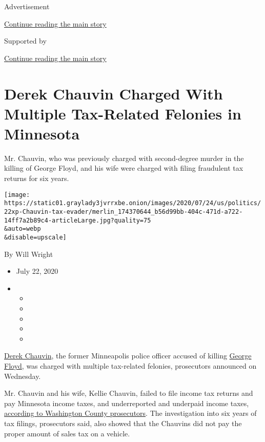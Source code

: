 Advertisement

\protect\hyperlink{after-top}{Continue reading the main story}

Supported by

\protect\hyperlink{after-sponsor}{Continue reading the main story}

\hypertarget{derek-chauvin-charged-with-multiple-tax-related-felonies-in-minnesota}{%
\section{Derek Chauvin Charged With Multiple Tax-Related Felonies in
Minnesota}\label{derek-chauvin-charged-with-multiple-tax-related-felonies-in-minnesota}}

Mr. Chauvin, who was previously charged with second-degree murder in the
killing of George Floyd, and his wife were charged with filing
fraudulent tax returns for six years.

\texttt{[image: https://static01.graylady3jvrrxbe.onion/images/2020/07/24/us/politics/22xp-Chauvin-tax-evader/merlin\_174370644\_b56d99bb-404c-471d-a722-14ff7a2b89c4-articleLarge.jpg?quality=75\\\&auto=webp\\\&disable=upscale]}

By Will Wright

\begin{itemize}
\item
  July 22, 2020
\item
  \begin{itemize}
  \item
  \item
  \item
  \item
  \item
  \end{itemize}
\end{itemize}

\href{https://www.nytimes3xbfgragh.onion/2020/07/18/us/derek-chauvin-george-floyd.html}{Derek
Chauvin}, the former Minneapolis police officer accused of killing
\href{https://www.nytimes3xbfgragh.onion/article/george-floyd-who-is.html}{George
Floyd}, was charged with multiple tax-related felonies, prosecutors
announced on Wednesday.

Mr. Chauvin and his wife, Kellie Chauvin, failed to file income tax
returns and pay Minnesota income taxes, and underreported and underpaid
income taxes,
\href{https://www.co.washington.mn.us/CivicAlerts.aspx?AID=3065}{according
to Washington County prosecutors}. The investigation into six years of
tax filings, prosecutors said, also showed that the Chauvins did not pay
the proper amount of sales tax on a vehicle.

